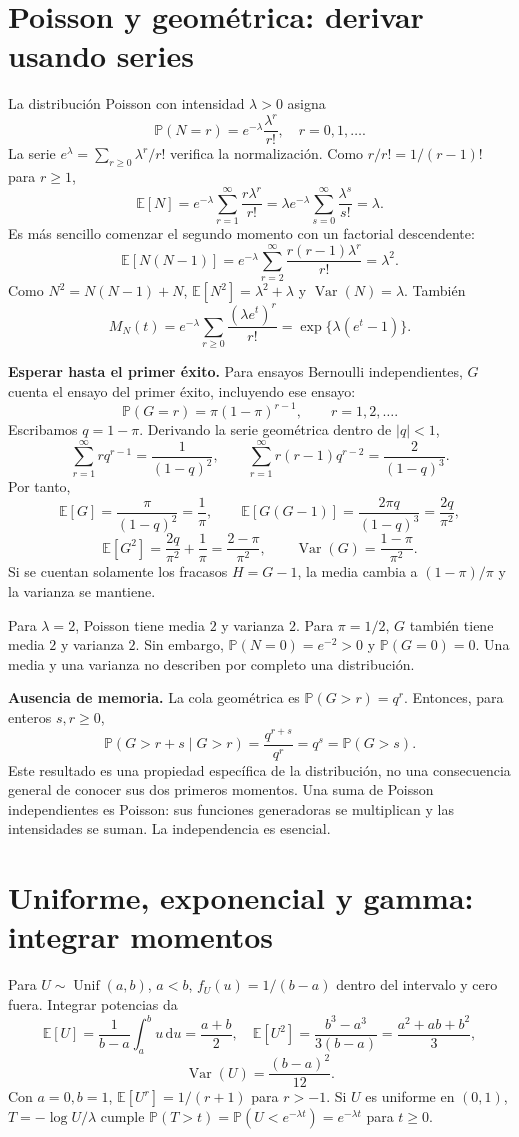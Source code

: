 \documentclass[11pt,a4paper]{article}
\newcommand{\E}{\mathbb E}
\newcommand{\Prob}{\mathbb P}
\newcommand{\dd}{\,\mathrm d}
\newcommand{\abs}[1]{\left\lvert #1\right\rvert}
\DeclareMathOperator{\Var}{Var}
\newcommand{\topic}[2]{\clearpage\section{#1}\label{#2}}
\theoremstyle{definition}\newtheorem{definicion}[teorema]{Definición}
\begin{document}
\topic{Poisson y geométrica: derivar usando series}{s03}
La distribución Poisson con intensidad $\lambda>0$ asigna
\[
\Prob(N=r)=e^{-\lambda}\frac{\lambda^r}{r!},\quad r=0,1,\ldots.
\]
La serie $e^\lambda=\sum_{r\ge0}\lambda^r/r!$ verifica la normalización.
Como $r/r!=1/(r-1)!$ para $r\ge1$,
\[
\E[N]=e^{-\lambda}\sum_{r=1}^\infty
\frac{r\lambda^r}{r!}
=\lambda e^{-\lambda}\sum_{s=0}^\infty\frac{\lambda^s}{s!}
=\lambda.
\]
Es más sencillo comenzar el segundo momento con un factorial descendente:
\[
\E[N(N-1)]
=e^{-\lambda}\sum_{r=2}^\infty\frac{r(r-1)\lambda^r}{r!}
=\lambda^2.
\]
Como $N^2=N(N-1)+N$, $\E[N^2]=\lambda^2+\lambda$ y
$\boxed{\Var(N)=\lambda}$. También
\[
M_N(t)=e^{-\lambda}\sum_{r\ge0}\frac{(\lambda e^t)^r}{r!}
=\exp\{\lambda(e^t-1)\}.
\]

\textbf{Esperar hasta el primer éxito.} Para ensayos Bernoulli independientes,
$G$ cuenta el ensayo del primer éxito, incluyendo ese ensayo:
\[
\Prob(G=r)=\pi(1-\pi)^{r-1},\qquad r=1,2,\ldots.
\]
Escribamos $q=1-\pi$. Derivando la serie geométrica dentro de $\abs q<1$,
\[
\sum_{r=1}^{\infty}rq^{r-1}=\frac1{(1-q)^2},\qquad
\sum_{r=1}^{\infty}r(r-1)q^{r-2}=\frac2{(1-q)^3}.
\]
Por tanto,
\[
\E[G]=\frac{\pi}{(1-q)^2}=\frac1\pi,\qquad
\E[G(G-1)]=\frac{2\pi q}{(1-q)^3}=\frac{2q}{\pi^2},
\]
\[
\E[G^2]=\frac{2q}{\pi^2}+\frac1\pi=\frac{2-\pi}{\pi^2},
\qquad \boxed{\Var(G)=\frac{1-\pi}{\pi^2}}.
\]
Si se cuentan solamente los fracasos $H=G-1$, la media cambia a
$(1-\pi)/\pi$ y la varianza se mantiene.

\begin{ejemplo}
Para $\lambda=2$, Poisson tiene media $2$ y varianza $2$.
Para $\pi=1/2$, $G$ también tiene media $2$ y varianza $2$.
Sin embargo, $\Prob(N=0)=e^{-2}>0$ y $\Prob(G=0)=0$.
Una media y una varianza no describen por completo una distribución.
\end{ejemplo}
\textbf{Ausencia de memoria.} La cola geométrica es
$\Prob(G>r)=q^r$. Entonces, para enteros $s,r\ge0$,
\[
\Prob(G>r+s\mid G>r)
=\frac{q^{r+s}}{q^r}=q^s=\Prob(G>s).
\]
Este resultado es una propiedad específica de la distribución, no una
consecuencia general de conocer sus dos primeros momentos.
Una suma de Poisson independientes es Poisson: sus funciones generadoras
se multiplican y las intensidades se suman. La independencia es esencial.

\topic{Uniforme, exponencial y gamma: integrar momentos}{s04}
Para $U\sim\operatorname{Unif}(a,b)$, $a<b$,
$f_U(u)=1/(b-a)$ dentro del intervalo y cero fuera. Integrar potencias da
\[
\E[U]=\frac1{b-a}\int_a^bu\dd u=\frac{a+b}{2},
\quad
\E[U^2]=\frac{b^3-a^3}{3(b-a)}=\frac{a^2+ab+b^2}{3},
\]
\[
\boxed{\Var(U)=\frac{(b-a)^2}{12}}.
\]
Con $a=0,b=1$, $\E[U^r]=1/(r+1)$ para $r>-1$. Si $U$ es uniforme
en $(0,1)$, $T=-\log U/\lambda$ cumple
$\Prob(T>t)=\Prob(U<e^{-\lambda t})=e^{-\lambda t}$ para $t\ge0$.
\end{document}
